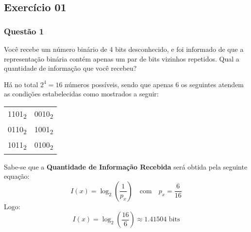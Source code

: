 \documentclass[es572.tex]{subfiles}
\begin{document}
    \subsection{Exercício 01}
        \subsubsection{Questão 1}
            \begin{exercise}
                Você recebe um número binário de 4 bits desconhecido, e foi informado de que a representação binária contém apenas um par de bits vizinhos repetidos. Qual a quantidade de informação que você recebeu?
            \end{exercise}
            \begin{resolution}
                Há no total $2^{4} = 16$ números possíveis, sendo que apenas $6$ os seguintes atendem as condições estabelecidas como mostrados a seguir:
                    \begin{table}[H]
                        \centering
                        \begin{tabular}[]{cc}\hline
                            1101\textsubscript{2} & 0010\textsubscript{2}\\
                            0110\textsubscript{2} & 1001\textsubscript{2}\\
                            1011\textsubscript{2} & 0100\textsubscript{2}\\\hline
                        \end{tabular}
                    \end{table}\noindent
                Sabe-se que a \textbf{Quantidade de Informação Recebida} será obtida pela seguinte equação:
                    \begin{equation*}
                        I(x) = \log_{2}\left(\frac{1}{p_{x}}\right)
                        \quad\text{com}\quad
                        p_{x} = \frac{6}{16}
                    \end{equation*}
                Logo:
                    \begin{equation*}
                        I(x) = \log_{2}\left(\frac{16}{6}\right) \approx 1.41504 \text{ bits}
                    \end{equation*}
            \end{resolution}
\end{document}
